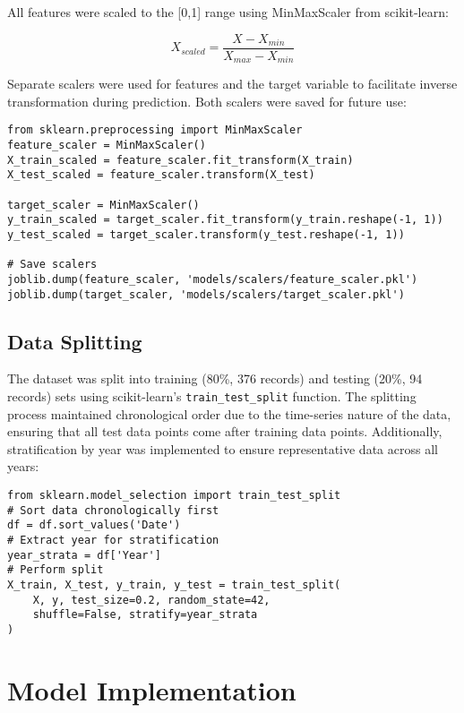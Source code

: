 \documentclass[12pt]{article}
\begin{document}
All features were scaled to the [0,1] range using MinMaxScaler from scikit-learn:

\begin{equation}
X_{scaled} = \frac{X - X_{min}}{X_{max} - X_{min}}
\end{equation}

Separate scalers were used for features and the target variable to facilitate inverse transformation during prediction. Both scalers were saved for future use:

\begin{verbatim}
from sklearn.preprocessing import MinMaxScaler
feature_scaler = MinMaxScaler()
X_train_scaled = feature_scaler.fit_transform(X_train)
X_test_scaled = feature_scaler.transform(X_test)

target_scaler = MinMaxScaler()
y_train_scaled = target_scaler.fit_transform(y_train.reshape(-1, 1))
y_test_scaled = target_scaler.transform(y_test.reshape(-1, 1))

# Save scalers
joblib.dump(feature_scaler, 'models/scalers/feature_scaler.pkl')
joblib.dump(target_scaler, 'models/scalers/target_scaler.pkl')
\end{verbatim}

\subsection{Data Splitting}
\label{subsec:data_splitting}

The dataset was split into training (80\%, 376 records) and testing (20\%, 94 records) sets using scikit-learn's \texttt{train\_test\_split} function. The splitting process maintained chronological order due to the time-series nature of the data, ensuring that all test data points come after training data points. Additionally, stratification by year was implemented to ensure representative data across all years:

\begin{verbatim}
from sklearn.model_selection import train_test_split
# Sort data chronologically first
df = df.sort_values('Date')
# Extract year for stratification
year_strata = df['Year']
# Perform split
X_train, X_test, y_train, y_test = train_test_split(
    X, y, test_size=0.2, random_state=42, 
    shuffle=False, stratify=year_strata
)
\end{verbatim}

\section{Model Implementation}
\label{sec:model_implementation}
\end{document}
